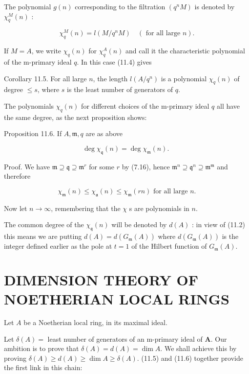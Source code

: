 \documentclass{standalone}
\theoremstyle{definition}
\theoremstyle{remark}
\begin{document}
The polynomial $g(n)$ corresponding to the filtration $\left(q^{n} M\right)$ is denoted by $\chi_{q}^{M}(n)$ :

\[
\chi_{q}^{M}(n)=l\left(M / q^{n} M\right) \quad(\text { for all large } n) .
\]

If $M=A$, we write $\chi_{q}(n)$ for $\chi_{q}^{A}(n)$ and call it the characteristic polynomial of the m-primary ideal $q$. In this case (11.4) gives

Corollary 11.5. For all large $n$, the length $l\left(A / q^{n}\right)$ is a polynomial $\chi_{q}(n)$ of degree $\leqslant s$, where $s$ is the least number of generators of $q$.

The polynomials $\chi_{q}(n)$ for different choices of the m-primary ideal $q$ all have the same degree, as the next proposition shows:

Proposition 11.6. If $A, \mathfrak{m}, q$ are as above

\[
\operatorname{deg} \chi_{\mathfrak{q}}(n)=\operatorname{deg} \chi_{\mathfrak{m}}(n) \text {. }
\]

Proof. We have $\mathfrak{m} \supseteq \mathfrak{q} \supseteq \mathfrak{m}^{r}$ for some $r$ by (7.16), hence $\mathfrak{m}^{n} \supseteq \mathfrak{q}^{n} \supseteq \mathfrak{m}^{\mathfrak{m}}$ and therefore

\[
\chi_{\mathfrak{m}}(n) \leqslant \chi_{\mathfrak{a}}(n) \leqslant \chi_{\mathfrak{m}}(r n) \text { for all large } n .
\]

Now let $n \rightarrow \infty$, remembering that the $\chi$ s are polynomials in $n$.

The common degree of the $\chi_{\mathfrak{q}}(n)$ will be denoted by $d(A)$ : in view of (11.2) this means we are putting $d(A)=d\left(G_{\mathfrak{m}}(A)\right)$ where $d\left(G_{\mathfrak{m}}(A)\right)$ is the integer defined earlier as the pole at $t=1$ of the Hilbert function of $G_{\mathfrak{m}}(A)$.

\section{DIMENSION THEORY OF NOETHERIAN LOCAL RINGS}
Let $A$ be a Noetherian local ring, in its maximal ideal.

Let $\delta(A)=$ least number of generators of an m-primary ideal of $\boldsymbol{A}$. Our ambition is to prove that $\delta(A)=d(A)=\operatorname{dim} A$. We shall achieve this by proving $\delta(A) \geqslant d(A) \geqslant \operatorname{dim} A \geqslant \delta(A)$. (11.5) and (11.6) together provide the first link in this chain:
\end{document}
